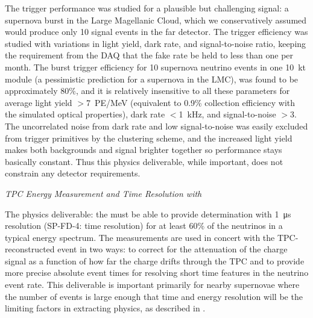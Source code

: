 
The  trigger performance was studied for a plausible but challenging signal: a supernova burst in the Large Magellanic Cloud, which we conservatively assumed would produce only 10 signal events in the far detector. The trigger efficiency was studied with variations in light yield, dark rate, and signal-to-noise ratio, keeping the requirement from the DAQ that the fake rate be held to less than one per month. The burst trigger efficiency for 10 supernova neutrino events in one \SI{10}{kt} module (a  pessimistic prediction for a supernova in the LMC), was found to be approximately $80\%$, and it is relatively insensitive to all these parameters for average light yield $>$\SI{7}{PE/MeV} (equivalent to 0.9\% collection efficiency with the simulated optical properties), dark rate $<$\SI{1}{kHz}, and signal-to-noise $>3$. The uncorrelated noise from dark rate and low signal-to-noise was easily excluded from trigger primitives by the clustering scheme, and the increased light yield makes both backgrounds and signal brighter together so performance stays basically constant. Thus this physics deliverable, while important, does not constrain any detector requirements.


\textit{TPC Energy Measurement and Time Resolution with \tzero}\nopagebreak


The physics deliverable: the  must be able to provide \tzero determination with \SI{1}{\micro s} resolution (SP-FD-4: time resolution) for at least 60\% of the neutrinos in a typical  energy spectrum. The \tzero measurements are used in concert with the TPC-reconstructed event in two ways: to correct for the attenuation of the charge signal as a function of how far the charge drifts through the TPC and to provide more precise absolute event times for resolving short time features in the  neutrino event rate. This deliverable is important primarily for nearby supernovae where the number of events is large enough that time and energy resolution will be the limiting factors in extracting physics, as described in \physchsnb{}. %

